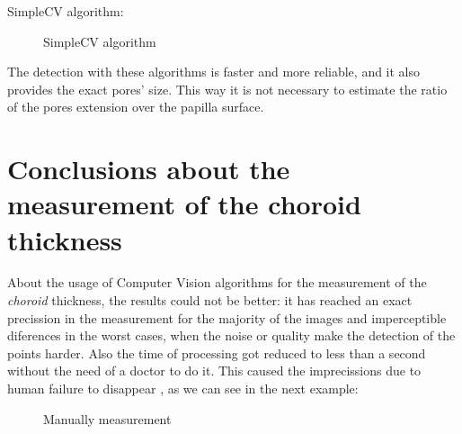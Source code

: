 SimpleCV algorithm:

    \begin{figure}[H]
      \caption{SimpleCV algorithm}
      \centering \setlength\fboxsep{0pt} \setlength\fboxrule{0.5pt}
    \end{figure}

The detection with these algorithms is faster and more reliable, and it
also provides the exact pores' size. This way it is not necessary to
estimate the ratio of the pores extension over the papilla surface.


\section{Conclusions about the measurement of the choroid thickness}
About the usage of Computer Vision algorithms for the measurement of
the \emph{choroid} thickness, the results could not be better:
it has reached an exact precission in the measurement for the majority
of the images and imperceptible diferences in the worst cases, when
the noise or quality make the detection of the points harder.
Also the time of processing got reduced to less than a second without
the need of a doctor to do it. This caused the imprecissions due to human failure to disappear
, as we can see in the next example:

    \begin{figure}[H]
      \caption{Manually measurement}
      \centering \setlength\fboxsep{0pt} \setlength\fboxrule{0.5pt}
    \end{figure}

